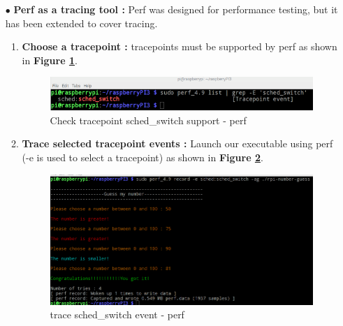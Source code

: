\begin{itemize}
\begin{itemize}
    				
	\end{itemize}

	
	
	


	
	
	
	\item[$\bullet$] \textbf{Perf as a tracing tool : } Perf was designed for performance testing, but it has been extended to cover tracing.
		\begin{enumerate}
			\item \textbf{Choose a tracepoint : } tracepoints must be supported by perf as shown in \textbf{Figure \ref{Check tracepoint support - perf}}.
					\begin{figure}[H]
						\centering
        				\includegraphics[scale=0.55]{img/solution/check-sched-switch-support-perf.png}
        				\caption{Check tracepoint sched\_switch support - perf}
        				\label{Check tracepoint support - perf}
    				\end{figure}		
			
			\item \textbf{Trace selected tracepoint events : } Launch our executable using perf (-e is used to select a tracepoint) as shown in \textbf{Figure \ref{trace sched-switch event - perf}}.
					\begin{figure}[H]
						\centering
        				\includegraphics[scale=0.4]{img/solution/trace-sched-switch-perf.png}
        				\caption{trace sched\_switch event - perf}
        				\label{trace sched-switch event - perf}
    				\end{figure}			
			

\end{enumerate}
\end{itemize}
